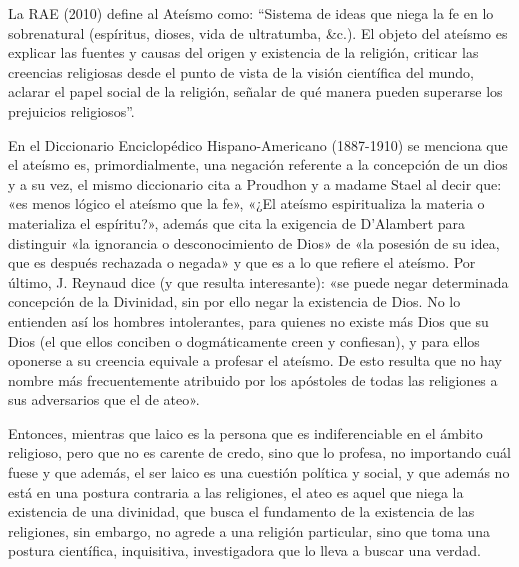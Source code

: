 La RAE (2010) define al Ateísmo como: “Sistema de ideas que niega la fe en lo sobrenatural (espíritus, dioses, vida de ultratumba, \&c.). El objeto del ateísmo es explicar las fuentes y causas del origen y existencia de la religión, criticar las creencias religiosas desde el punto de vista de la visión científica del mundo, aclarar el papel social de la religión, señalar de qué manera pueden superarse los prejuicios religiosos”.

En el Diccionario Enciclopédico Hispano-Americano (1887-1910) se menciona que el ateísmo es, primordialmente, una negación referente a la concepción de un dios y a su vez, el mismo diccionario cita a Proudhon y a madame Stael al decir que: «es menos lógico el ateísmo que la fe», «¿El ateísmo espiritualiza la materia o materializa el espíritu?», además que cita la exigencia de D'Alambert para distinguir «la ignorancia o desconocimiento de Dios» de «la posesión de su idea, que es después rechazada o negada» y que es a lo que refiere el ateísmo. Por último, J. Reynaud dice (y que resulta interesante): «se puede negar determinada concepción de la Divinidad, sin por ello negar la existencia de Dios. No lo entienden así los hombres intolerantes, para quienes no existe más Dios que su Dios (el que ellos conciben o dogmáticamente creen y confiesan), y para ellos oponerse a su creencia equivale a profesar el ateísmo. De esto resulta que no hay nombre más frecuentemente atribuido por los apóstoles de todas las religiones a sus adversarios que el de ateo».

Entonces, mientras que laico es la persona que es indiferenciable en el ámbito religioso, pero que no es carente de credo, sino que lo profesa, no importando cuál fuese y que además, el ser laico es una cuestión política y social, y que además no está en una postura contraria a las religiones, el ateo es aquel que niega la existencia de una divinidad, que busca el fundamento de la existencia de las religiones, sin embargo, no agrede a una religión particular, sino que toma una postura científica, inquisitiva, investigadora que lo lleva a buscar una verdad.
